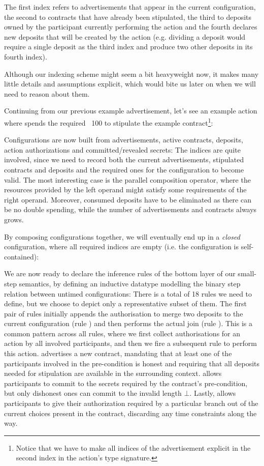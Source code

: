 \documentclass[acmsmall,nonacm=true,screen=true]{acmart}
\begin{document}
The first index refers to advertisements that appear in the current configuration, the second to contracts that have
already been stipulated, the third to deposits owned by the participant currently performing the action and the fourth
declares new deposits that will be created by the action
(e.g. dividing a deposit would require a single deposit as the third index and produce two other deposits in its fourth index).

Although our indexing scheme might seem a bit heavyweight now, it makes many little details and assumptions explicit,
which would bite us later on when we will need to reason about them.

Continuing from our previous example advertisement, let's see an example action where \inlineA{} spends the required \bitcoin ~100
to stipulate the example contract\footnote{
Notice that we have to make all indices of the advertisement explicit in the second index in the action's type signature.
}:
\BITactionExample{}

Configurations are now built from advertisements, active contracts, deposits, action authorizations and committed/revealed secrets:
\BITconfigurations{}
The indices are quite involved, since we need to record both the current advertisements, stipulated contracts and deposits
and the required ones for the configuration to become valid. The most interesting case is the parallel composition
operator, where the resources provided by the left operand might satisfy some requirements of the right operand. Moreover,
consumed deposits have to be eliminated as there can be no double spending, while the number of advertisements and contracts
always grows.

By composing configurations together, we will eventually end up in a \textit{closed} configuration, where 
all required indices are empty (i.e. the configuration is self-contained):
\BITclosedConfigurations{}

We are now ready to declare the inference rules of the bottom layer of our small-step semantics,
by defining an inductive datatype modelling the binary step relation between untimed configurations:
\BITrules{}
There is a total of 18 rules we need to define, but we choose to depict only a representative subset of them.
The first pair of rules initially appends the authorisation to merge
two deposits to the current configuration (rule \inlineAuthJoinRule{}) and then performs the actual join (rule \inlineJoinRule{}).
This is a common pattern across all rules, where we first collect authorisations for an action by all involved participants,
and then we fire a subsequent rule to perform this action.
\inlineAdvertiseRule{} advertises a new contract, mandating that at least one of the participants involved in the pre-condition
is honest and requiring that all deposits needed for stipulation are available in the surrounding context.
\inlineAuthCommitRule{} allows participants to commit to the secrets required by the contract's pre-condition, but only dishonest
ones can commit to the invalid length $\bot$.
Lastly, \inlineControlRule{} allows participants to give their authorization required by a particular branch out of the current
choices present in the contract, discarding any time constraints along the way.
\end{document}
